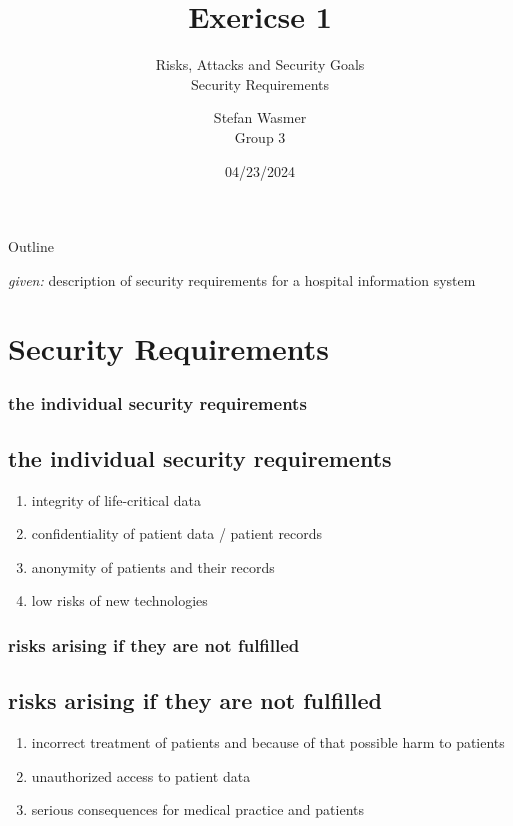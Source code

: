\documentclass{beamer}
\title{Exericse 1}
\subtitle{
    Risks, Attacks and Security Goals\\
    Security Requirements
}
\author{
    Stefan Wasmer \\ Group 3
    }
\institute{TU Ilmenau}
\date{04/23/2024}
\begin{document}
\begin{frame}
    \titlepage
\end{frame}

\begin{frame}{Outline}
    \tableofcontents

    \textit{given:} description of security requirements for a hospital information system
\end{frame}

\section{Security Requirements}

\begin{frame}
    \frametitle{the individual security requirements}
    \subsection{the individual security requirements}
    \begin{enumerate}
        \item integrity of life-critical data
        \item confidentiality of patient data / patient records
        \item anonymity of patients and their records
        \item low risks of new technologies
    \end{enumerate}
\end{frame}


\begin{frame}
    \frametitle{risks arising if they are not fulfilled}
    \subsection{risks arising if they are not fulfilled}
    \begin{enumerate}
        \item incorrect treatment of patients and because of that possible harm to patients
        \item unauthorized access to patient data
        \item serious consequences for medical practice and patients
    \end{enumerate}
\end{frame}
\end{document}
